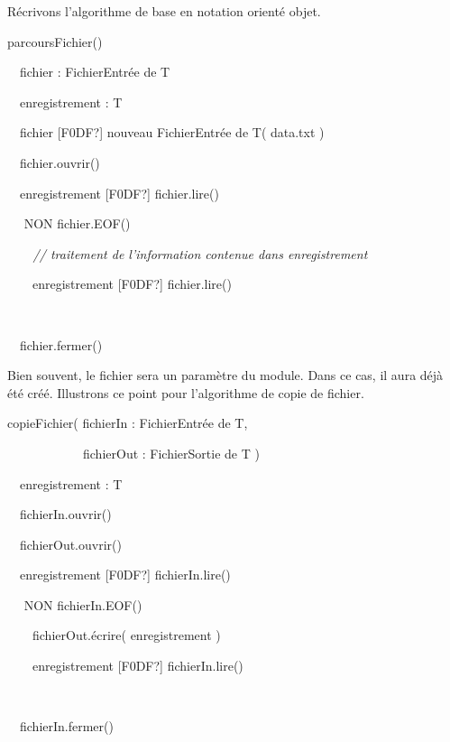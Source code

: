 {
Récrivons l'algorithme de base en notation orienté
objet.}

{\sffamily
{} parcoursFichier() }

{\sffamily
\ \ fichier : FichierEntrée de T}

{\sffamily
\ \ enregistrement : T}

{\sffamily
\ \ fichier {\textrm{[F0DF?]}} nouveau
FichierEntrée de T( {\textquotedbl}data.txt{\textquotedbl} )}

{\sffamily
\ \ fichier.ouvrir() }

{\sffamily
\ \ enregistrement {\textrm{[F0DF?]}}
fichier.lire()}

{\sffamily
\ \   NON fichier.EOF()
 }

{\sffamily\itshape
\ \ \ \ // traitement de l’information contenue dans enregistrement}

{\sffamily
\ \ \ \ enregistrement {\textrm{[F0DF?]}}
fichier.lire()}

{\sffamily
\ \    }

{\sffamily
\ \ fichier.fermer() }

{\sffamily
{}}

{
Bien souvent, le fichier sera un paramètre du module. Dans ce cas, il
aura déjà été créé. Illustrons ce point pour
l'algorithme de copie de fichier.}

{\sffamily
{} copieFichier( fichierIn : FichierEntrée de T, }

{\sffamily
\ \ \ \ \ \ \ \  \ \ \ \ fichierOut : FichierSortie de T ) }

{\sffamily
\ \ enregistrement : T }

{\sffamily
\ \ fichierIn.ouvrir() }

{\sffamily
\ \ fichierOut.ouvrir() }

{\sffamily
\ \ enregistrement {\textrm{[F0DF?]}}
fichierIn.lire()}

{\sffamily
\ \   NON fichierIn.EOF()
 }

{\sffamily
\ \ \ \ fichierOut.écrire( enregistrement )}

{\sffamily
\ \ \ \ enregistrement {\textrm{[F0DF?]}}
fichierIn.lire()}

{\sffamily
\ \    }

{\sffamily
\ \ fichierIn.fermer() }

